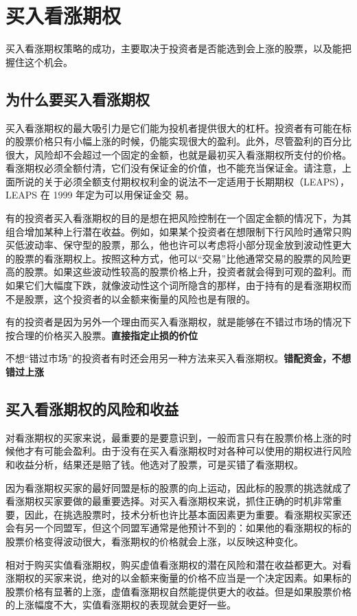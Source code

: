 \chapter{买入看涨期权}
买入看涨期权策略的成功，主要取决于投资者是否能选到会上涨的股票，以及能把握住这个机会。
\section{为什么要买入看涨期权}
买入看涨期权的最大吸引力是它们能为投机者提供很大的杠杆。投资者有可能在标的股票价格只有小幅上涨的时候，仍能实现很大的盈利。此外，尽管盈利的百分比很大，风险却不会超过一个固定的金额，也就是最初买入看涨期权所支付的价格。看涨期权必须全额付清，它们没有保证金的价值，也不能充当保证金。请注意，上面所说的关于必须全额支付期权权利金的说法不一定适用于长期期权（LEAPS），LEAPS 在 1999 年定为可以用保证金交
易。

有的投资者买入看涨期权的目的是想在把风险控制在一个固定金额的情况下，为其组合增加某种上行潜在收益。例如，如果某个投资者在想限制下行风险时通常只购买低波动率、保守型的股票，那么，他也许可以考虑将小部分现金放到波动性更大的股票的看涨期权上。按照这种方式，他可以“交易”比他通常交易的股票的风险更高的股票。如果这些波动性较高的股票价格上升，投资者就会得到可观的盈利。而如果它们大幅度下跌，就像波动性这个词所隐含的那样，由于持有的是看涨期权而不是股票，这个投资者的以金额来衡量的风险也是有限的。

有的投资者是因为另外一个理由而买入看涨期权，就是能够在不错过市场的情况下按合理的价格买入股票。\textbf{直接指定止损的价位}

不想“错过市场”的投资者有时还会用另一种方法来买入看涨期权。\textbf{错配资金，不想错过上涨}
\section{买入看涨期权的风险和收益}
对看涨期权的买家来说，最重要的是要意识到，一般而言只有在股票价格上涨的时候他才有可能会盈利。由于没有在买入看涨期权时对各种可以使用的期权进行风险和收益分析，结果还是赔了钱。他选对了股票，可是买错了看涨期权。

因为看涨期权买家的最好同盟是标的股票的向上运动，因此标的股票的挑选就成了看涨期权买家要做的最重要选择。对买入看涨期权来说，抓住正确的时机非常重要，因此，在挑选股票时，技术分析也许比基本面因素更为重要。看涨期权买家还会有另一个同盟军，但这个同盟军通常是他预计不到的：如果他的看涨期权的标的股票价格变得波动很大，看涨期权的价格就会上涨，以反映这种变化。

相对于购买实值看涨期权，购买虚值看涨期权的潜在风险和潜在收益都更大。对看涨期权的买家来说，绝对的以金额来衡量的价格不应当是一个决定因素。如果标的股票价格有显著的上涨，虚值看涨期权自然能提供更大的收益。但是如果股票价格的上涨幅度不大，实值看涨期权的表现就会更好一些。

